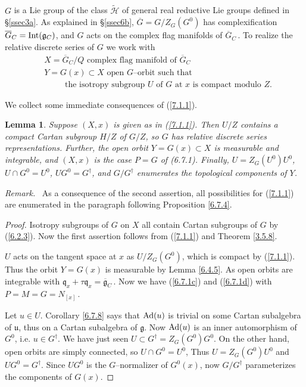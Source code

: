 \documentclass{conm-p-l}
\newtheorem{lemma}[equation]{Lemma}
\renewcommand{\gg}{\mathfrak{g}}
\newcommand{\gq}{\mathfrak{q}}
\def\gg{\mathfrak{g}}
\def\gq{\mathfrak{q}}
\def\gu{\mathfrak{u}}
\def\Int{{\rm Int}}
\def\Ad{{\rm Ad}}
\def\cH{\mathcal{H}}
\begin{document}
\subsection{}\label{ssec7a}\setcounter{equation}{0}
$G$ is a Lie group of the class $\widetilde{\cH}$ of general real
reductive Lie groups defined in \S\ref{ssec3a}.  As explained in 
\S\ref{ssec6b}, $\overline{G} = G/Z_G(G^0)$ has
complexification $\overline{G}_C = \Int(\gg_C)$, and $G$ acts on the
complex flag manifolds of $\overline{G}_C$\,.  To realize the relative discrete
series of $G$ we work with 
\begin{equation}\label{7.1.1}
\begin{aligned}
&X = \overline{G}_C/Q \text{ complex flag manifold of }
	\overline{G}_C \\
&Y = G(x) \subset X \text{ open $G$--orbit such that} \\
&\phantom{XXX} \text{the isotropy subgroup $U$ of $G$ at $x$ 
	is compact modulo } Z.
\end{aligned}
\end{equation}

We collect some immediate consequences of (\ref{7.1.1}).

\begin{lemma}\label{7.1.2}
Suppose $(X,x)$ is given as in {\rm (\ref{7.1.1})}.  Then $U/Z$ contains 
a compact Cartan subgroup $H/Z$ of $G/Z$, so
$G$ has relative discrete series representations.  Further, the open orbit
$Y = G(x) \subset X$ is measurable and integrable, and $(X,x)$ is the
case $P = G$ of {\rm (6.7.1)}.  Finally, $U = Z_G(U^0)U^0$, $U \cap G^0 = U^0$,
$UG^0 = G^\dagger$, and $G/G^\dagger$ enumerates the topological
components of $Y$.
\end{lemma}

{\sl Remark.}\,\,\,  As a consequence of the second assertion, all 
possibilities for (\ref{7.1.1}) are enumerated in the paragraph following
Proposition \ref{6.7.4}.

\begin{proof}  Isotropy subgroups of $G$ on $X$ all contain Cartan
subgroups of $G$ by (\ref{6.2.3}).  Now the first assertion follows from
(\ref{7.1.1}) and Theorem \ref{3.5.8}.

$U$ acts on the tangent space at $x$ as $U/Z_G(G^0)$, which is compact by 
(\ref{7.1.1}).  Thus the orbit $Y = G(x)$ is measurable by 
Lemma \ref{6.4.5}.
As open orbits are integrable with $\gq_x + \tau\gq_x = \overline{\gg}_C$\,.
Now we have (\ref{6.7.1c}) and (\ref{6.7.1d}) with $P = M = G = N_{[x]}$\,.

Let $u \in U$.  Corollary \ref{6.7.8} says that $\Ad(u)$ is trivial on some
Cartan subalgebra of $\gu$, thus on a Cartan subalgebra of $\gg$.  Now
$\Ad(u)$ is an inner automorphism of $G^0$, i.e. $u \in G^\dagger$.
We have just seen $U \subset G^\dagger = Z_G(G^0)G^0$.  On the other
hand, open orbits are simply connected, so $U \cap G^0 = U^0$,  Thus
$U = Z_G(G^0)U^0$ and $UG^0 = G^\dagger$.  Since $UG^0$ is the
$G$--normalizer of $G^0(x)$, now $G/G^\dagger$ parameterizes the
components of $G(x)$.
\end{proof}
\medskip
\end{document}
